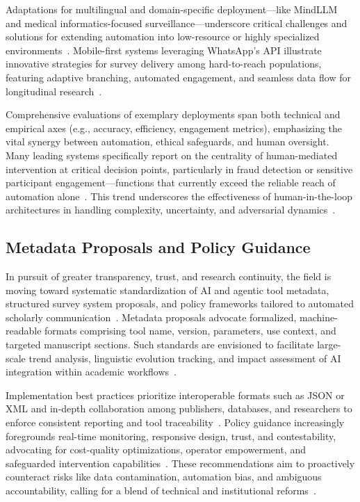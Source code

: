 \documentclass[sigconf]{acmart}
\begin{document}
Adaptations for multilingual and domain-specific deployment—like MindLLM and medical informatics-focused surveillance—underscore critical challenges and solutions for extending automation into low-resource or highly specialized environments~\cite{ref92,ref94,ref95,ref100}. Mobile-first systems leveraging WhatsApp’s API illustrate innovative strategies for survey delivery among hard-to-reach populations, featuring adaptive branching, automated engagement, and seamless data flow for longitudinal research~\cite{ref104,ref112,ref113,ref114,ref115,ref117}.

Comprehensive evaluations of exemplary deployments span both technical and empirical axes (e.g., accuracy, efficiency, engagement metrics), emphasizing the vital synergy between automation, ethical safeguards, and human oversight. Many leading systems specifically report on the centrality of human-mediated intervention at critical decision points, particularly in fraud detection or sensitive participant engagement—functions that currently exceed the reliable reach of automation alone~\cite{ref93,ref112,ref113,ref114,ref115,ref117}. This trend underscores the effectiveness of human-in-the-loop architectures in handling complexity, uncertainty, and adversarial dynamics~\cite{ref85,ref86,ref91,ref94,ref95,ref117}.

\subsection{Metadata Proposals and Policy Guidance}

In pursuit of greater transparency, trust, and research continuity, the field is moving toward systematic standardization of AI and agentic tool metadata, structured survey system proposals, and policy frameworks tailored to automated scholarly communication~\cite{ref106}\cite{ref111}\cite{ref117}. Metadata proposals advocate formalized, machine-readable formats comprising tool name, version, parameters, use context, and targeted manuscript sections. Such standards are envisioned to facilitate large-scale trend analysis, linguistic evolution tracking, and impact assessment of AI integration within academic workflows~\cite{ref106}.

Implementation best practices prioritize interoperable formats such as JSON or XML and in-depth collaboration among publishers, databases, and researchers to enforce consistent reporting and tool traceability~\cite{ref106}\cite{ref117}. Policy guidance increasingly foregrounds real-time monitoring, responsive design, trust, and contestability, advocating for cost-quality optimizations, operator empowerment, and safeguarded intervention capabilities~\cite{ref111}. These recommendations aim to proactively counteract risks like data contamination, automation bias, and ambiguous accountability, calling for a blend of technical and institutional reforms~\cite{ref111}\cite{ref117}.
\end{document}
